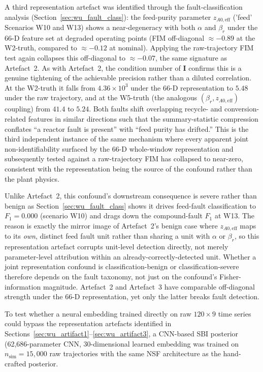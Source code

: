 \documentclass[aps,pre,twocolumn,superscriptaddress]{revtex4-2}
\begin{document}
A third representation artefact was identified through the fault-classification
analysis (Section~\ref{sec:wu_fault_class}): the feed-purity parameter
$z_{A0,\mathrm{eff}}$ ('feed' Scenarios W10 and W13) shows a near-degeneracy with both $\alpha$ and $\beta_r$
under the 66-D feature set at degraded operating points (FIM off-diagonal
$\approx -0.89$ at the W2-truth, compared to $\approx -0.12$ at nominal).
Applying the raw-trajectory FIM test again collapses this off-diagonal to
$\approx -0.07$, the same signature as Artefact~2.  As with Artefact~2, the
condition number of $\mathbf{I}$ confirms this is a genuine tightening of the
achievable precision rather than a diluted correlation. At the W2-truth it
falls from $4.36\times10^3$ under the 66-D representation to $5.48$ under the
raw trajectory, and at the W5-truth (the analogous $(\beta_r,z_{A0,\mathrm{eff}})$
coupling) from $41.4$ to $5.24$.  Both faults shift
overlapping recycle- and conversion-related features in similar directions such that
the summary-statistic compression conflates ``a reactor fault is present''
with ``feed purity has drifted.'' This is the third independent instance of
the same mechanism where every apparent joint non-identifiability surfaced by the
66-D whole-window representation and subsequently tested against a raw-trajectory
FIM has collapsed to near-zero, consistent with the representation being the
source of the confound rather than the plant physics.

Unlike Artefact~2, this confound's downstream consequence is severe rather
than benign as Section~\ref{sec:wu_fault_class} shows it drives feed-fault
classification to $F_1 = 0.000$ (scenario W10) and drags down the
compound-fault $F_1$ at W13. The reason is exactly the mirror image of
Artefact~2's benign case where $z_{A0,\mathrm{eff}}$ maps to its \emph{own}, distinct
feed fault unit rather than sharing a unit with $\alpha$ or $\beta_r$, so this
representation artefact corrupts unit-level detection directly, not merely
parameter-level attribution within an already-correctly-detected unit.
Whether a joint representation confound is classification-benign or
classification-severe therefore depends on the fault taxonomy, not just on
the confound's Fisher-information magnitude. Artefact~2 and Artefact~3 have
comparable off-diagonal strength under the 66-D representation, yet only the
latter breaks fault detection.



To test whether a neural embedding trained directly on raw $120\times9$ 
time series could bypass the representation artefacts identified in
Sections~\ref{sec:wu_artifact1}--\ref{sec:wu_artifact3}, a CNN-based SBI
posterior (62,686-parameter CNN, 30-dimensional learned embedding was trained on
$n_\mathrm{sim}=15{,}000$ raw trajectories with the same NSF
architecture as the hand-crafted posterior. 
\end{document}
